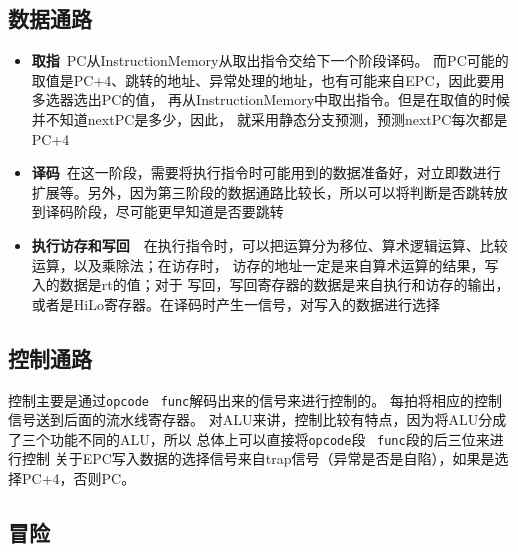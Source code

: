 \documentclass[UTF8]{ctexart}
\begin{document}
\subsection{数据通路}
\begin{itemize}
    \item{\textbf{取指}\   PC从InstructionMemory从取出指令交给下一个阶段译码。
    而PC可能的取值是PC+4、跳转的地址、异常处理的地址，也有可能来自EPC，因此要用多选器选出PC的值，
    再从InstructionMemory中取出指令。但是在取值的时候并不知道nextPC是多少，因此，
    就采用静态分支预测，预测nextPC每次都是PC+4}
    \item{\textbf{译码}\  在这一阶段，需要将执行指令时可能用到的数据准备好，对立即数进行扩展等。另外，因为第三阶段的数据通路比较长，所以可以将判断是否跳转放到译码阶段，尽可能更早知道是否要跳转}
    \item{\textbf{执行访存和写回}\ \  在执行指令时，可以把运算分为移位、算术逻辑运算、比较运算，以及乘除法；在访存时，
    访存的地址一定是来自算术运算的结果，写入的数据是rt的值；对于
    写回，写回寄存器的数据是来自执行和访存的输出，或者是HiLo寄存器。在译码时产生一信号，对写入的数据进行选择}
\end{itemize}
\subsection{控制通路}
控制主要是通过\texttt{opcode} \ \texttt{func}解码出来的信号来进行控制的。
每拍将相应的控制信号送到后面的流水线寄存器。
对ALU来讲，控制比较有特点，因为将ALU分成了三个功能不同的ALU，所以
总体上可以直接将\texttt{opcode}段 \ \texttt{func}段的后三位来进行控制
关于EPC写入数据的选择信号来自trap信号（异常是否是自陷），如果是选择PC+4，否则PC。
\subsection{冒险}
\end{document}
